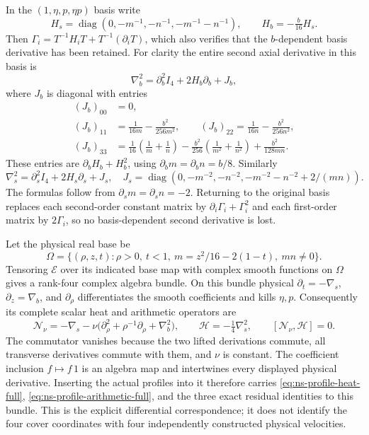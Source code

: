 In the $(1,\eta,p,\eta p)$ basis write
\[
 H_s=\operatorname{diag}(0,-m^{-1},-n^{-1},-m^{-1}-n^{-1}),
 \qquad H_b=-\tfrac b{16}H_s.
\]
Then $\Gamma_i=T^{-1}H_iT+T^{-1}(\partial_iT)$, which
also verifies that the $b$-dependent basis derivative has been retained.
For clarity the entire second axial derivative in this basis is
\[
 \nabla_b^2=\partial_b^2I_4+2H_b\partial_b+J_b,
\]
where $J_b$ is diagonal with entries
\begin{align*}
 (J_b)_{00}&=0,\\
 (J_b)_{11}&=\frac1{16m}-\frac{b^2}{256m^2},\qquad
 (J_b)_{22}=\frac1{16n}-\frac{b^2}{256n^2},\\
 (J_b)_{33}&=\frac1{16}\left(\frac1m+\frac1n\right)
 -\frac{b^2}{256}\left(\frac1{m^2}+\frac1{n^2}\right)
 +\frac{b^2}{128mn}.
\end{align*}
These entries are $\partial_bH_b+H_b^2$, using
$\partial_bm=\partial_bn=b/8$. Similarly
\[
 \nabla_s^2=\partial_s^2I_4+2H_s\partial_s+J_s,
 \quad J_s=\operatorname{diag}
 \left(0,-m^{-2},-n^{-2},-m^{-2}-n^{-2}+2/(mn)\right).
\]
The formulas follow from $\partial_sm=\partial_sn=-2$.
Returning to the original basis replaces each second-order constant
matrix by $\partial_i\Gamma_i+\Gamma_i^2$ and each first-order
matrix by $2\Gamma_i$, so no basis-dependent second derivative is lost.

Let the physical real base be
\[
 \Omega=\{(\rho,z,t):\rho>0,\ t<1,\ m=z^2/16-2(1-t),\ mn\ne0\}.
\]
Tensoring $\mathcal E$ over its indicated base map with complex smooth
functions on $\Omega$ gives a rank-four complex algebra bundle.
On this bundle physical $\partial_t=-\nabla_s$,
$\partial_z=\nabla_b$, and $\partial_\rho$ differentiates the smooth
coefficients and kills $\eta,p$. Consequently its complete scalar
heat and arithmetic operators are
\begin{equation}\label{eq:ns-flat-heat-connection}
 \mathcal N_\nu=-\nabla_s-\nu\bigl(
 \partial_\rho^2+\rho^{-1}\partial_\rho+\nabla_b^2\bigr),
 \qquad \mathcal H=-\tfrac14\nabla_s^2,
 \qquad [\mathcal N_\nu,\mathcal H]=0.
\end{equation}
The commutator vanishes because the two lifted derivations commute,
all transverse derivatives commute with them, and $\nu$ is constant.
The coefficient inclusion $f\mapsto f\,1$ is an algebra map and
intertwines every displayed physical derivative. Inserting the actual
profiles into it therefore carries \eqref{eq:ns-profile-heat-full},
\eqref{eq:ns-profile-arithmetic-full}, and the three exact residual
identities to this bundle. This is the explicit differential
correspondence; it does not identify the four cover coordinates with
four independently constructed physical velocities.


